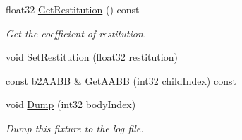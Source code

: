 \begin{DoxyCompactItemize}
\mbox{\label{classb2Fixture_ac30becb6f936a9cc825952ca2b40aa14}} 
float32 \hyperlink{classb2Fixture_ac30becb6f936a9cc825952ca2b40aa14}{Get\+Restitution} () const
\begin{DoxyCompactList}\small\item\em Get the coefficient of restitution. \end{DoxyCompactList}\item 
void \hyperlink{classb2Fixture_a19c507332e4f7bd04a05f00426f11ee4}{Set\+Restitution} (float32 restitution)
\item 
const \hyperlink{structb2AABB}{b2\+A\+A\+BB} \& \hyperlink{classb2Fixture_a5081778c838ac090bc785bfbf6d76ab7}{Get\+A\+A\+BB} (int32 child\+Index) const
\item 
\mbox{\label{classb2Fixture_a57485e73a2063060e320c7176676cd5e}} 
void \hyperlink{classb2Fixture_a57485e73a2063060e320c7176676cd5e}{Dump} (int32 body\+Index)
\begin{DoxyCompactList}\small\item\em Dump this fixture to the log file. \end{DoxyCompactList}\end{DoxyCompactItemize}
